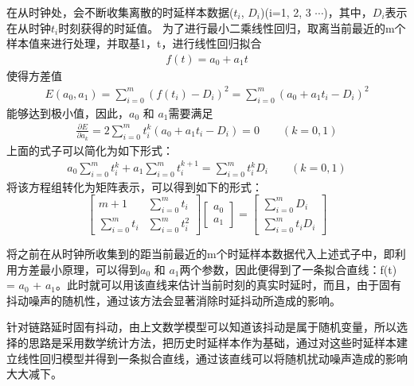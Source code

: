 在从时钟处，会不断收集离散的时延样本数据($t_{i}$, $D_{i}$)(i=1, 2, 3 $\cdots$)，其中，$D_{i}$表示在从时钟$t_{i}$时刻获得的时延值。
为了进行最小二乘线性回归，取离当前最近的m个样本值来进行处理，并取基1，t，进行线性回归拟合
\begin {align}
f(t) = a_{0} + a_{1}t
\end{align}
使得方差值
\begin{align}
E(a_{0}, a_{1}) = \sum_{i=0}^{m}(f(t_{i}) - D_{i})^{2}
	= \sum_{i=0}^{m}(a_{0} + a_{1}t_{i} - D_{i})^{2}
\end{align}
能够达到极小值，因此，$a_{0}$ 和 $a_{1}$需要满足
\begin{align}
	\frac{\partial E}{\partial a_{k}} = 2 \sum_{i=0}^{m}t_{i}^{k}(a_{0} + a_{1}t_{i} - D_{i}) = 0
	\qquad(k = 0, 1)
\end{align}
上面的式子可以简化为如下形式：
\begin{align}
	a_{0}\sum_{i=0}^{m}t_{i}^{k} + a_{1}\sum_{i=0}^{m}t_{i}^{k+1} = \sum_{i=0}^{m}t_{i}^{k}D_{i}
	\qquad(k = 0, 1)
\end{align}
将该方程组转化为矩阵表示，可以得到如下的形式：
\begin{equation}
	\begin{bmatrix}
		m+1 & \sum_{i=0}^{m}t_{i} \\ 
		\sum_{i=0}^{m}t_{i} & \sum_{i=0}^{m}t_{i}^{2}
	\end{bmatrix}
	\begin{bmatrix}
	a_{0} \\ a_{1}
	\end{bmatrix}
	=
	\begin{bmatrix}
	 \sum_{i=0}^{m}D_{i} \\ \sum_{i=0}^{m}t_{i}D_{i}
	\end{bmatrix}
\end{equation}

将之前在从时钟所收集到的距当前最近的m个时延样本数据代入上述式子中，即利用方差最小原理，可以得到$a_{0}$ 和 $a_{1}$两个参数，因此便得到了一条拟合直线：f(t) = $a_{0}$ + $a_{1}$。此时就可以用该直线来估计当前时刻的真实时延时，而且，由于固有抖动噪声的随机性，通过该方法会显著消除时延抖动所造成的影响。

针对链路延时固有抖动，由上文数学模型可以知道该抖动是属于随机变量，所以选择的思路是采用数学统计方法，把历史时延样本作为基础，通过对这些时延样本建立线性回归模型并得到一条拟合直线，通过该直线可以将随机扰动噪声造成的影响大大减下。

